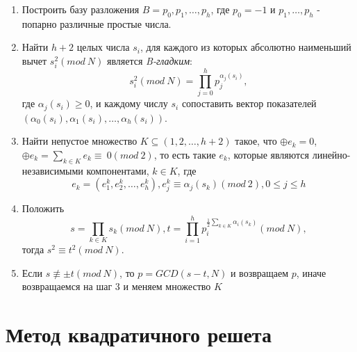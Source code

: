     \begin{enumerate}
     \item Построить базу разложения $B = {p_{0}, p_{1}, \dots, p_{h}}$, 
     где $p_{0} = -1$ и $p_{1}, \dots, p_{h}$ - попарно различные простые числа.

     \item Найти $h + 2$ целых числа $s_{i}$, для каждого из которых абсолютно наименьший вычет
     $s_{i}^{2}(mod \: N)$ является \textit{B-гладким}:     
      	\begin{equation} \label{eq:prime-fact-si}
      	  s_{i}^{2}(mod \: N) = \prod_{j=0}^{h}{p_j^{\alpha_{j} (s_i)}},
      	\end{equation}
      где $\alpha_{j} (s_i) \ge 0$, и каждому числу $s_i$ сопоставить вектор показателей \\
      $(\alpha_0(s_i), \alpha_1(s_i), \dots, \alpha_h(s_i))$.
     
     \item Найти непустое множество $K \subseteq (1, 2, \dots, h+2)$ такое, что $\oplus e_{k} = 0$, $\oplus e_{k} = \sum_{k \in K}{e_k} \equiv \: 0 (mod \: 2)$, 
     то есть такие $e_k$, которые являются линейно-независимыми компонентами, $k \in K$, где      
    	\begin{equation} \label{eq:prime-fact-ek}
    	  e_k = (e_1^k, e_2^k, \dots, e_h^k), e_j^k \equiv \alpha_j(s_k)(mod \: 2), 0 \le j \le h
    	\end{equation}     
     \item Положить      
    	\begin{equation} \label{eq:prime-fact-sprod}
    	  s = \prod_{k \in K}{s_k(mod \: N)}, t = \prod_{i=1}^{h}{p_{i}^{\frac{1}{2} \sum_{k \in K}{\alpha_i (s_k)}}(mod \: N)},
    	\end{equation}     
     тогда $s^{2} \equiv t^{2}(mod \: N)$.
     \item Если $s \not\equiv \pm t(mod \: N)$, то $p = GCD(s - t, N)$ и возвращаем $p$, иначе возвращаемся на шаг 3 и меняем множество $K$
    \end{enumerate}
  

\section{Метод квадратичного решета}

